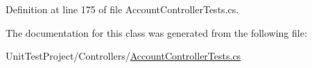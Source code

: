 Definition at line 175 of file Account\+Controller\+Tests.\+cs.



The documentation for this class was generated from the following file\+:\begin{DoxyCompactItemize}
\item 
Unit\+Test\+Project/\+Controllers/\mbox{\hyperlink{_account_controller_tests_8cs}{Account\+Controller\+Tests.\+cs}}\end{DoxyCompactItemize}
